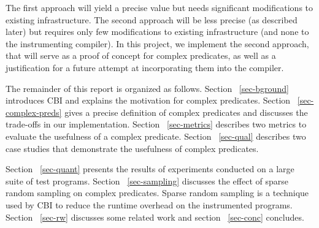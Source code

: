 The first approach will yield a precise value but needs significant modifications to existing infrastructure.  The second approach will be less precise (as described later) but requires only few modifications to existing infrastructure (and none to the instrumenting compiler).  In this project, we implement the second approach, that will serve as a proof of concept for complex predicates, as well as a justification for a future attempt at incorporating them into the compiler.

The remainder of this report is organized as follows.  Section ~\ref{sec-bground} introduces CBI and explains the motivation for complex predicates.  Section ~\ref{sec-complex-preds} gives a precise definition of complex predicates and discusses the trade-offs in our implementation.  Section ~\ref{sec-metrics} describes two metrics to evaluate the usefulness of a complex predicate.  Section ~\ref{sec-qual} describes two case studies that demonstrate the usefulness of complex predicates.  

Section ~\ref{sec-quant} presents the results of experiments conducted on a large suite of test programs.  Section ~\ref{sec-sampling} discusses the effect of sparse random sampling on complex predicates.  Sparse random sampling is a technique used by CBI to reduce the runtime overhead on the instrumented programs.  Section ~\ref{sec-rw} discusses some related work and section ~\ref{sec-conc} concludes.
